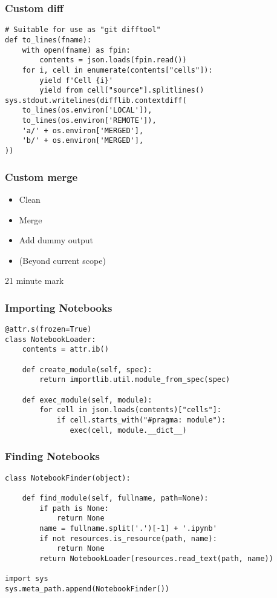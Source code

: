 \begin{frame}[fragile]
\frametitle{Custom diff}

\begin{lstlisting}
# Suitable for use as "git difftool"
def to_lines(fname):
    with open(fname) as fpin:
        contents = json.loads(fpin.read())
    for i, cell in enumerate(contents["cells"]):
        yield f'Cell {i}'
        yield from cell["source"].splitlines()
sys.stdout.writelines(difflib.contextdiff(
    to_lines(os.environ['LOCAL']),
    to_lines(os.environ['REMOTE']),
    'a/' + os.environ['MERGED'],
    'b/' + os.environ['MERGED'],
))
\end{lstlisting}


\end{frame}

\begin{frame}
\frametitle{Custom merge}

\begin{itemize}
\item Clean
\item Merge
\item Add dummy output
\item (Beyond current scope)
\end{itemize}

\end{frame}


21 minute mark

\begin{frame}[fragile]
\frametitle{Importing Notebooks}

\begin{lstlisting}
@attr.s(frozen=True)
class NotebookLoader:
    contents = attr.ib()

    def create_module(self, spec):
        return importlib.util.module_from_spec(spec)

    def exec_module(self, module):
        for cell in json.loads(contents)["cells"]:
            if cell.starts_with("#pragma: module"):
               exec(cell, module.__dict__)
\end{lstlisting}

\end{frame}

\begin{frame}[fragile]
\frametitle{Finding Notebooks}

\begin{lstlisting}
class NotebookFinder(object):
 
    def find_module(self, fullname, path=None):
        if path is None:
            return None
        name = fullname.split('.')[-1] + '.ipynb'
        if not resources.is_resource(path, name):
            return None
        return NotebookLoader(resources.read_text(path, name))

import sys
sys.meta_path.append(NotebookFinder())
\end{lstlisting}

\end{frame}

